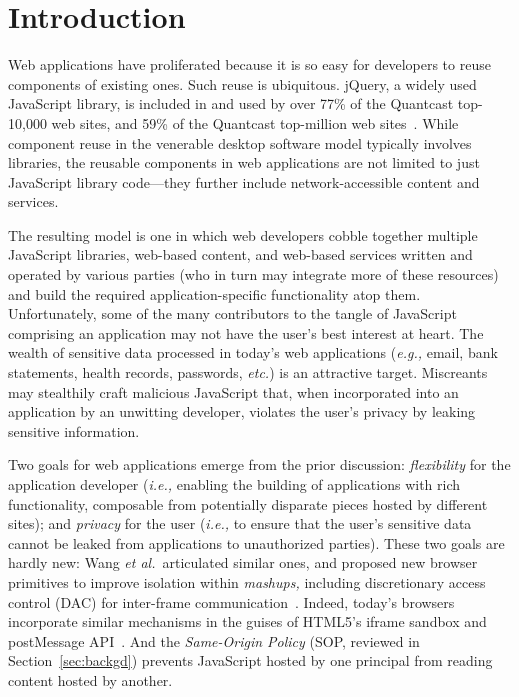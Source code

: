 \section{Introduction}
\label{sec:intro}

Web applications have proliferated because it is so easy for
developers to reuse components of existing ones. Such reuse is
ubiquitous. jQuery, a widely used JavaScript library, is included in
and used by over 77\% of the Quantcast top-10,000 web sites, and 59\%
of the Quantcast top-million web sites~\cite{quantcast}. While
component reuse in the venerable desktop software model typically
involves libraries, the reusable components in web applications are
not limited to just JavaScript library code---they further include
network-accessible content and services.

The resulting model is one in which web developers cobble together
multiple JavaScript libraries, web-based content, and web-based
services written and operated by various parties (who in turn may
integrate more of these resources) and build the required
application-specific functionality atop them. Unfortunately, some of
the many contributors to the tangle of JavaScript comprising an
application may not have the user's best interest at heart. The wealth
of sensitive data processed in today's web applications (\emph{e.g.,} email,
bank statements, health records, passwords, \emph{etc.}) is an attractive
target. Miscreants may stealthily craft malicious JavaScript that,
when incorporated into an application by an unwitting developer,
violates the user's privacy by leaking sensitive information.

Two goals for web applications emerge from the prior discussion:
\emph{flexibility} for the application developer (\emph{i.e.,} enabling the
building of applications with rich functionality, composable from
potentially disparate pieces hosted by different sites); and
\emph{privacy} for the user (\emph{i.e.,} to ensure that the user's sensitive
data cannot be leaked from applications to unauthorized parties).
These two goals are hardly new: Wang {\em et al.}\ articulated similar
ones, and proposed new browser primitives to improve isolation within
{\em mashups,} including discretionary access control (DAC) for inter-frame
communication~\cite{mashupos}. Indeed, today's browsers incorporate
similar mechanisms in the guises of HTML5's iframe sandbox and
postMessage API\@~\cite{html5}. And the {\em Same-Origin Policy} (SOP,
reviewed in Section~\ref{sec:backgd}) prevents JavaScript hosted by
one principal from reading content hosted by another.

